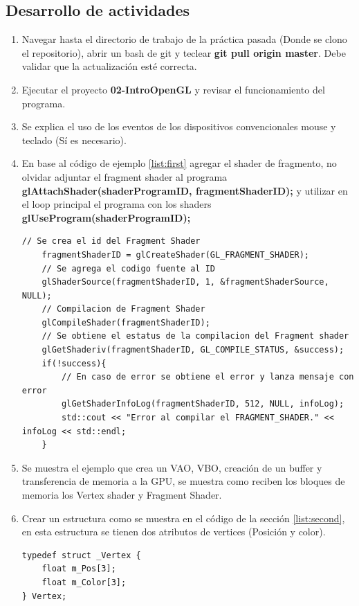 \documentclass[11pt, english]{article}
\begin{document}
\subsection{Desarrollo de actividades}
\begin{enumerate}
\item Navegar hasta el directorio de trabajo de la práctica pasada (Donde se clono el
repositorio), abrir un bash de git y teclear \textbf{git pull origin master}. Debe validar que
la actualización esté correcta.
\item Ejecutar el proyecto \textbf{02-IntroOpenGL} y revisar el funcionamiento del programa.
\item Se explica el uso de los eventos de los dispositivos convencionales mouse y
teclado (Sí es necesario).
\item En base al código de ejemplo \ref{list:first} agregar el shader de fragmento, no olvidar adjuntar el fragment shader al programa \textbf{glAttachShader(shaderProgramID, fragmentShaderID);} y utilizar en el loop principal el programa con los shaders \textbf{glUseProgram(shaderProgramID);}

\begin{lstlisting}[label={list:first},caption=Ejemplo para crear el Shader de Fragmento., style=customc]
	// Se crea el id del Fragment Shader
	fragmentShaderID = glCreateShader(GL_FRAGMENT_SHADER);
	// Se agrega el codigo fuente al ID
	glShaderSource(fragmentShaderID, 1, &fragmentShaderSource, NULL);
	// Compilacion de Fragment Shader
	glCompileShader(fragmentShaderID);
	// Se obtiene el estatus de la compilacion del Fragment shader
	glGetShaderiv(fragmentShaderID, GL_COMPILE_STATUS, &success);
	if(!success){
		// En caso de error se obtiene el error y lanza mensaje con error
		glGetShaderInfoLog(fragmentShaderID, 512, NULL, infoLog);
		std::cout << "Error al compilar el FRAGMENT_SHADER." << infoLog << std::endl;
	}
\end{lstlisting}

\item Se muestra el ejemplo que crea un VAO, VBO, creación de un buffer y
transferencia de memoria a la GPU, se muestra como reciben los bloques de
memoria los Vertex shader y Fragment Shader.
\item Crear un estructura como se muestra en el código de la sección \ref{list:second}, en esta estructura se tienen dos atributos de vertices (Posición y color).

\begin{lstlisting}[label={list:second},caption=Ejemplo para crear el Shader de Fragmento., style=customc]
typedef struct _Vertex {
	float m_Pos[3];
	float m_Color[3];
} Vertex;
\end{lstlisting}


\end{enumerate}
\end{document}
